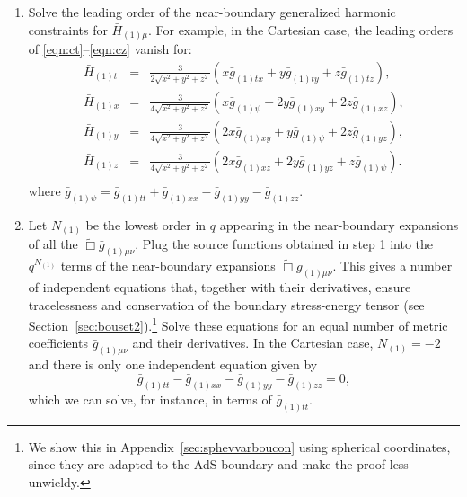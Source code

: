 \documentclass[aps,letterpaper,twocolumn,nofootinbib]{revtex4}
\numberwithin{equation}{section}
\begin{document}
\begin{enumerate}
\item Solve the leading order of the near-boundary generalized harmonic constraints for $\bar{H}_{(1)\mu}$.
For example, in the Cartesian case, the leading orders of \eqref{eqn:ct}--\eqref{eqn:cz} vanish for:
\begin{eqnarray}\label{eqn:target_gauge_txyz_step1}
\bar{H}_{(1)t}&=&\frac{3}{2\sqrt{x^2+y^2+z^2}}(x \bar{g}_{(1)tx}+y\bar{g}_{(1)ty}+z\bar{g}_{(1)tz}), \nonumber \\
\bar{H}_{(1)x}&=&\frac{3}{4\sqrt{x^2+y^2+z^2}}(x\bar{g}_{(1)\psi}+2y \bar{g}_{(1)xy}+2z \bar{g}_{(1)xz}), \nonumber \\
\bar{H}_{(1)y}&=&\frac{3}{4\sqrt{x^2+y^2+z^2}}(2x \bar{g}_{(1)xy}+y\bar{g}_{(1)\psi}+2z \bar{g}_{(1)yz}), \nonumber \\
\bar{H}_{(1)z}&=&\frac{3}{4\sqrt{x^2+y^2+z^2}}(2x \bar{g}_{(1)xz}+2y \bar{g}_{(1)yz}+z\bar{g}_{(1)\psi}). \nonumber \\
\end{eqnarray}
where $\bar{g}_{(1)\psi} = \bar{g}_{(1)tt}+ \bar{g}_{(1)xx}-\bar{g}_{(1)yy}-\bar{g}_{(1)zz}$.

\item Let $N_{(1)}$ be the lowest order in $q$ appearing in the near-boundary expansions of all the $\tilde{\Box}\bar{g}_{(1)\mu\nu}$. Plug the source functions obtained in step 1 into the $q^{N_{(1)}}$ terms of the near-boundary expansions $\tilde{\Box}\bar{g}_{(1)\mu\nu}$.
This gives a number of independent equations that, together with their derivatives, ensure tracelessness and conservation of the boundary stress-energy tensor (see Section~\ref{sec:bouset2}).\footnote{We show this in Appendix~\ref{sec:sphevvarboucon} using spherical coordinates, since they are adapted to the AdS boundary and make the proof less unwieldy.}
Solve these equations for an equal number of metric coefficients $\bar g_{(1)\mu\nu}$ and their derivatives.
In the Cartesian case, $N_{(1)}=-2$ and there is only one independent equation given by
\begin{equation}
\label{eq:cart_tracelessness}
\bar{g}_{(1)tt}-\bar{g}_{(1)xx}-\bar{g}_{(1)yy}-\bar{g}_{(1)zz}=0,
\end{equation}
which we can solve, for instance, in terms of $\bar g_{(1)tt}$.


\end{enumerate}
\end{document}

